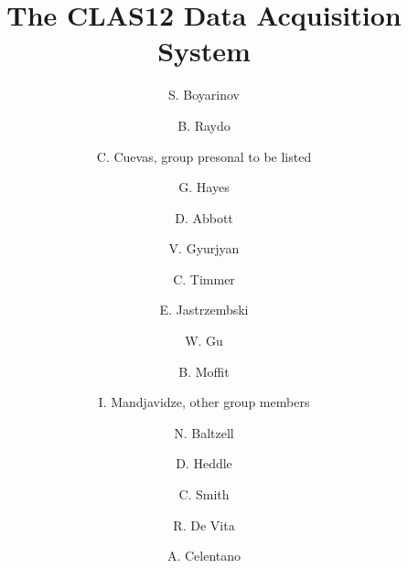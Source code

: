 \title{The CLAS12 Data Acquisition System}

\author[A]{S. Boyarinov}
\author[A]{B. Raydo}
\author[A]{C. Cuevas, group presonal to be listed}
\author[A]{G. Hayes}
\author[A]{D. Abbott}
\author[A]{V. Gyurjyan}
\author[A]{C. Timmer}
\author[A]{E. Jastrzembski}
\author[A]{W. Gu}
\author[A]{B. Moffit}
\author[B]{I. Mandjavidze, other group members}
\author[A]{N. Baltzell}
\author[A]{D. Heddle}
\author[A]{C. Smith}
\author[C]{R. De Vita}
\author[C]{A. Celentano}

\address[A]{Thomas Jefferson National Accelerator Facility, Newport News, VA, USA}
\address[B]{Sacley, France}
\address[C]{INFN, Milan, Italy}
